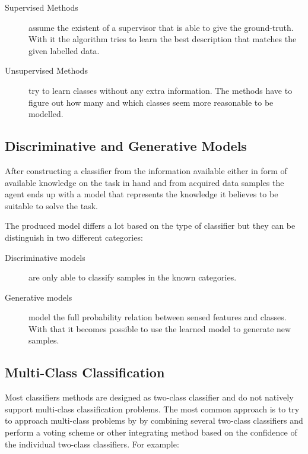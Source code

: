 \begin{description}
\item[Supervised Methods] assume the existent of a supervisor that is able to give the
ground\hyp{}truth. With it the algorithm tries to learn the best description that matches
the given labelled data.
\item[Unsupervised Methods] try to learn classes without any extra information. The methods
have to figure out how many and which classes seem more reasonable to be modelled.
\end{description}

\subsection{Discriminative and Generative Models}
\label{sec:discriminative-vs-generative}
After constructing a classifier from the information available either in form of
available knowledge on the task in hand and from acquired data samples the agent
ends up with a model that represents the knowledge it believes to be suitable to
solve the task.

The produced model differs a lot based on the type of classifier but they can be
distinguish in two different categories:
\begin{description}
\item[Discriminative models] are only able to classify samples in the known categories.
\item[Generative models] model the full probability relation between sensed
features and classes. With that it becomes possible to use the learned model to generate
new samples.
\end{description}


\subsection{Multi-Class Classification}
\label{sec:multiclass-classifiers}
Most classifiers methods are designed as two-class classifier and do not
natively support multi-class classification problems.
The most common approach is to try to approach multi-class problems by
by combining several two-class classifiers and perform a voting scheme or other
integrating method based on the confidence of the individual two-class classifiers.
For example:

